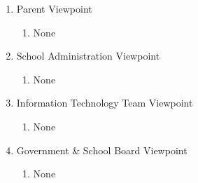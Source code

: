 \documentclass[]{article}
\begin{document}
\begin{enumerate}[{BE}1.]
\begin{enumerate}[{VP2}.1]
		\item Parent Viewpoint
			\begin{enumerate}
				\item None
			\end{enumerate}

		\item School Administration Viewpoint
			\begin{enumerate}
				\item None
			\end{enumerate}

		\item Information Technology Team Viewpoint
			\begin{enumerate}
				\item None
			\end{enumerate}

		\item Government \& School Board Viewpoint
			\begin{enumerate}
				\item None
			\end{enumerate}
	\end{enumerate}



\end{enumerate}
\end{document}
